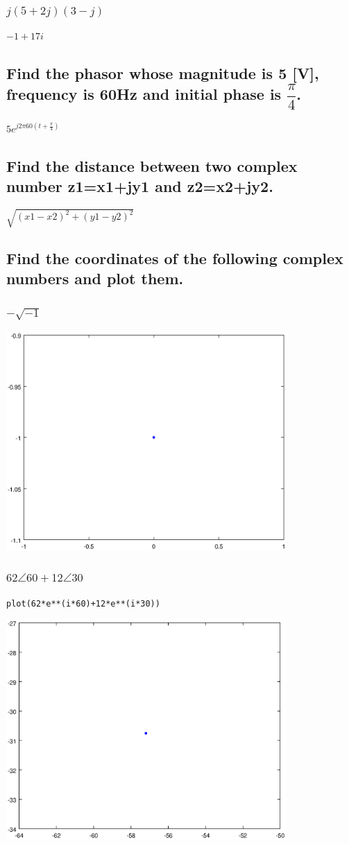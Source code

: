\documentclass[12pt,a4paper]{article}
\begin{document}
\subsubsection{$j(5+2j)(3-j)$} 
$-1+17i$
\subsection{Find the phasor whose magnitude is 5 [V], frequency is 60Hz	and initial phase is $\dfrac{\pi}{4}$.} 
$5e^{j2\pi 60 (t+\frac{\pi}{4})}$
\subsection{Find the distance between two complex number z1=x1+jy1 and z2=x2+jy2.}
$\sqrt{(x1-x2)^2+(y1-y2)^2}$
\subsection{Find the coordinates of the following complex numbers and plot them.}
\subsubsection{$-\sqrt{-1}$}
\includegraphics[width=0.8\textwidth]{6a.eps}
\subsubsection{$62\angle 60 + 12\angle 30$}
\begin{lstlisting}
plot(62*e**(i*60)+12*e**(i*30))
\end{lstlisting}

\includegraphics[width=0.8\textwidth]{6b.eps}
\end{document}
